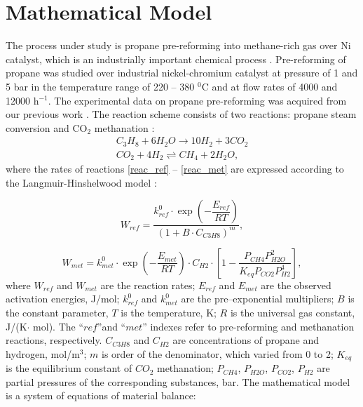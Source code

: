 \documentclass{svproc}
\begin{document}
\section{Mathematical Model}\label{Sec_math_mod}

The process under study is propane pre-reforming into methane-rich gas over Ni catalyst, which is an industrially important chemical process \cite{Uskov2019, Uskov2020}. Pre-reforming of propane was studied over industrial nickel-chromium catalyst at pressure of 1 and 5 bar in the temperature range of 220 -- 380 $^0$C and at flow rates of 4000 and 12000 h$^{-1}$. The experimental data on propane pre-reforming was acquired from our previous work \cite{Uskov2020}.  The reaction scheme consists of two reactions: propane steam conversion and CO$_2$ methanation \cite{Uskov2017}:
\begin{gather}
C_3H_8 + 6H_2O \rightarrow 10H_2 + 3CO_2 \label{reac_ref}\\
CO_2 + 4H_2 \rightleftharpoons CH_4 + 2H_2O \label{reac_met},
\end{gather}
where the rates of reactions \eqref{reac_ref} -- \eqref{reac_met} are expressed according to the Langmuir-Hinshelwood model \cite{Uskov2019}:

\[
W_{ref} = \dfrac{k_{ref}^0 \cdot \exp \left(- \dfrac{E_{ref}}{RT} \right) }{\left(1 + B \cdot C_{C3H8}\right)^m},
\]

\[
W_{met} = k_{met}^0 \cdot \exp \left(- \dfrac{E_{met}}{RT} \right) \cdot C_{H2} \cdot \left[1 - \dfrac{P_{CH4} P_{H2O}^2}{K_{eq} P_{CO2} P_{H2}^4 }\right] ,
\]
where $W_{ref}$ and $W_{met}$ are the reaction rates; $E_{ref}$ and $E_{met}$ are the observed activation energies, J/mol; $k^0_{ref}$ and $k^0_{met}$ are the pre–exponential multipliers; $B$ is the constant parameter, $T$ is the temperature, K; $R$ is the universal gas constant, J/(K$\cdot$ mol). The ``$ref$''and ``$met$'' indexes refer to pre-reforming and methanation reactions, respectively. $C_{C3H8}$ and $C_{H2}$ are concentrations of propane and hydrogen, mol/m$^3$; $m$ is order of the denominator, which varied from 0 to 2; $K_{eq}$ is the equilibrium constant of $CO_2$ methanation; $P_{CH4}$, $P_{H2O}$, $P_{CO2}$, $P_{H2}$ are partial pressures of the corresponding substances, bar. The mathematical model is a system of equations of material balance:
\end{document}
